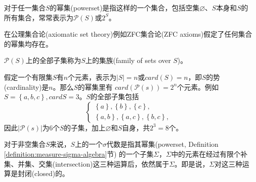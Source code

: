 \begin{definition}[幂集]
  \label{definition:measure-powerset}
  对于任一集合$S$的幂集(powerset)是指这样的一个集合，包括空集$\varnothing$、$S$本身和$S$的所有集合，常常表示为$\mathcal{P}(S)$或$2^{S}$。

  在公理集合论(axiomatic set theory)例如ZFC集合论(ZFC axioms)假定了任何集合的幂集均存在。

  $\mathcal{P}(S)$上的全部子集称为$S$上的集族(family of sets over $S$)。
\end{definition}

假定一个有限集$S$有$n$个元素，表示为$|S|=n$或$card(S)=n$，即$S$的势(cardinality)是$n$。那么$S$的幂集里有 $card(\mathcal{P}(s)) = 2^n$个元素。例如$S=\left\{a,b,c\right\}, card{S}=3$。$S$的全部子集包括
\begin{equation*}
  \begin{cases}
    \left\{ a \right\}, \left\{ b\right\},\left\{c\right\}, \\
    \left\{ a,b \right\},\left\{ a,c \right\},\left\{ b,c \right\},
  \end{cases}
\end{equation*}
因此$\left| \mathcal{P}(s) \right|$为6个$S$的子集，加上$\varnothing$和$S$自身，共$2^3=8$个。

对于非空集合$S$来说，$S$上的一个$\sigma$代数是指其幂集(powerset, Definition \ref{definition:measure-sigma-algebra}节) 的一个子集$\Sigma$，$\Sigma$中的元素在经过有限个补集、并集、交集(intersection)这三种运算后，依然属于$\Sigma$。即是说，$\Sigma$对这三种运算是封闭(closed)的。

